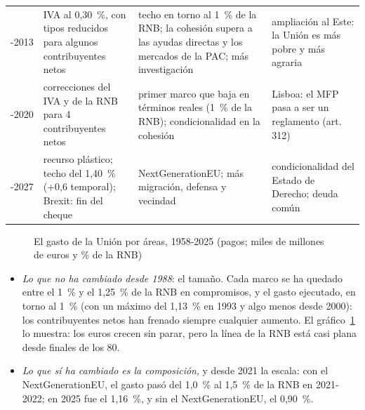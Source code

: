 \documentclass[11pt]{article}
\begin{document}
\begin{table}[H]
\begin{tabular}{>{\raggedright\arraybackslash}m{2.4cm}>{\raggedright\arraybackslash}m{4.4cm}>{\raggedright\arraybackslash}m{4.4cm}>{\raggedright\arraybackslash}m{3.9cm}}
2007-2013 & IVA al 0,30~\%, con tipos reducidos para algunos contribuyentes netos & techo en torno al 1~\% de la RNB; la cohesión supera a las ayudas directas y los mercados de la PAC; más investigación & ampliación al Este: la Unión es más pobre y más agraria\\
2014-2020 & correcciones del IVA y de la RNB para 4 contribuyentes netos & primer marco que baja en términos reales (1~\% de la RNB); condicionalidad en la cohesión & Lisboa: el MFP pasa a ser un reglamento (art. 312)\\
2021-2027 & recurso plástico; techo del 1,40~\% (+0,6 temporal); Brexit: fin del cheque & NextGenerationEU; más migración, defensa y vecindad & condicionalidad del Estado de Derecho; deuda común\\
\hline
\end{tabular}
\end{table}

\begin{figure}[H]
\centering
\caption{El gasto de la Unión por áreas, 1958-2025 (pagos; miles de millones de euros y \% de la RNB)}\label{fig:gastos}
\end{figure}

\begin{itemize}
\item \emph{Lo que no ha cambiado desde 1988}: el tamaño. Cada marco se ha quedado entre el 1~\% y el 1,25~\% de la RNB en compromisos, y el gasto ejecutado, en torno al 1~\% (con un máximo del 1,13~\% en 1993 y algo menos desde 2000): los contribuyentes netos han frenado siempre cualquier aumento. El gráfico~\ref{fig:gastos} lo muestra: los euros crecen sin parar, pero la línea de la RNB está casi plana desde finales de los 80.
\item \emph{Lo que sí ha cambiado es la composición}, y desde 2021 la escala: con el NextGenerationEU, el gasto pasó del 1,0~\% al 1,5~\% de la RNB en 2021-2022; en 2025 fue el 1,16~\%, y sin el NextGenerationEU, el 0,90~\%.
\end{itemize}
\end{document}
